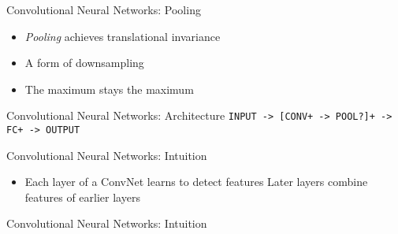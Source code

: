 \begin{frame}[fragile]{Convolutional Neural Networks: Pooling}
  \begin{itemize}
    \item<1-> \emph{Pooling} achieves translational invariance
    \item<2-> A form of downsampling
    \item<3-> The maximum stays the maximum
  \end{itemize}
  \vspace{0.5cm}
   { \vspace{1cm} }

  \begin{center}
\end{center}
\end{frame}
%
\begin{slide}{Convolutional Neural Networks: Architecture}
  \texttt{INPUT -> [CONV+ -> POOL?]+ -> FC+ -> OUTPUT}
\end{slide}

\begin{slide}{Convolutional Neural Networks: Intuition}
  \begin{itemize}
    \item Each layer of a ConvNet learns to detect features
    \pitem Later layers combine features of earlier layers
  \end{itemize}
\end{slide}

\begin{slide}{Convolutional Neural Networks: Intuition}

\end{slide}

